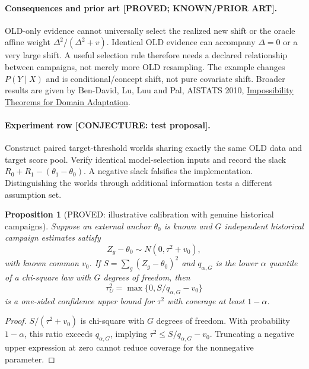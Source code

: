 \documentclass[11pt]{article}
\newtheorem{proposition}[theorem]{Proposition}
\theoremstyle{definition}
\theoremstyle{remark}
\begin{document}
\paragraph{Consequences and prior art [PROVED; KNOWN/PRIOR ART].}
OLD-only evidence cannot universally select the realized new shift or
the oracle affine weight $\Delta^2/(\Delta^2+v)$.  Identical OLD evidence
can accompany $\Delta=0$ or a very large shift.  A useful selection rule
therefore needs a declared relationship between campaigns, not merely
more OLD resampling.  The example changes $P(Y\mid X)$ and is
conditional/concept shift, not pure covariate shift.  Broader results are
given by Ben-David, Lu, Luu and Pal, AISTATS 2010,
\href{https://proceedings.mlr.press/v9/david10a.html}{Impossibility Theorems for Domain Adaptation}.

\paragraph{Experiment row [CONJECTURE: test proposal].}
Construct paired target-threshold worlds sharing exactly the same OLD
data and target score pool.  Verify identical model-selection inputs
and record the slack $R_0+R_1-(\theta_1-\theta_0)$.  A negative slack
falsifies the implementation.  Distinguishing the worlds through
additional information tests a different assumption set.

\begin{proposition}[PROVED: illustrative calibration with genuine historical campaigns]
Suppose an external anchor $\theta_0$ is known and $G$ independent
historical campaign estimates satisfy
\[
 Z_g-\theta_0\sim N(0,\tau^2+v_0),
\]
with known common $v_0$.  If $S=\sum_g(Z_g-\theta_0)^2$ and
$q_{\alpha,G}$ is the lower $\alpha$ quantile of a chi-square law with
$G$ degrees of freedom, then
\[
 \tau_U^2=\max\{0,S/q_{\alpha,G}-v_0\}
\]
is a one-sided confidence upper bound for $\tau^2$ with coverage at
least $1-\alpha$.
\end{proposition}
\begin{proof}
$S/(\tau^2+v_0)$ is chi-square with $G$ degrees of freedom.  With
probability $1-\alpha$, this ratio exceeds $q_{\alpha,G}$, implying
$\tau^2\leq S/q_{\alpha,G}-v_0$.  Truncating a negative upper expression
at zero cannot reduce coverage for the nonnegative parameter.
\end{proof}
\end{document}
